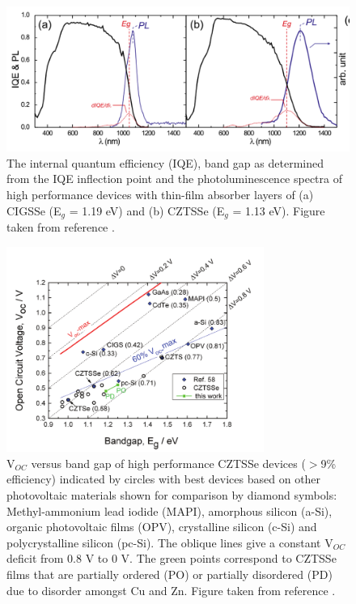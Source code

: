 \documentclass[11pt, twoside]{report}
\begin{document}
\begin{figure}[h!]
  \centering
    \includegraphics[width=1.0\textwidth]{figures/CZTS+CIGS_PL.png}
    \caption{The internal quantum efficiency (IQE), band gap as determined from the IQE inflection point and the photoluminescence spectra of high performance devices with thin-film absorber layers of (a) CIGSSe (E$_g$ = 1.19 eV) and (b) CZTSSe (E$_g$ = 1.13 eV). Figure taken from reference .}
  \label{CZTS+CIGS_PL}
\end{figure}

\begin{figure}[h!]
  \centering
    \includegraphics[width=0.75\textwidth]{figures/Voc.png}
    \caption{V$_{OC}$ versus band gap of high performance CZTSSe devices ($>$9\% efficiency) indicated by circles with best devices based on other photovoltaic materials shown for comparison by diamond symbols: Methyl-ammonium lead iodide (MAPI), amorphous silicon (a-Si), organic photovoltaic films (OPV), crystalline silicon (c-Si) and polycrystalline silicon (pc-Si). The oblique lines give a constant V$_{OC}$ deficit from 0.8 V to 0 V. The green points correspond to CZTSSe films that are partially ordered (PO) or partially disordered (PD) due to disorder amongst Cu and Zn. Figure taken from reference .}
  \label{Voc}
\end{figure}
\end{document}
